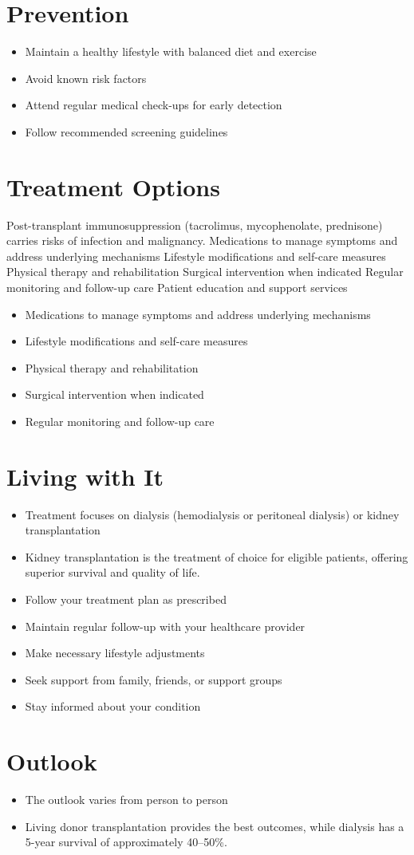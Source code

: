 \section{Prevention}
\begin{itemize}[noitemsep]
  \item Maintain a healthy lifestyle with balanced diet and exercise
  \item Avoid known risk factors
  \item Attend regular medical check-ups for early detection
  \item Follow recommended screening guidelines
\end{itemize}
\section{Treatment Options}
Post-transplant immunosuppression (tacrolimus, mycophenolate, prednisone) carries risks of infection and malignancy. Medications to manage symptoms and address underlying mechanisms Lifestyle modifications and self-care measures Physical therapy and rehabilitation Surgical intervention when indicated Regular monitoring and follow-up care Patient education and support services

\begin{itemize}[noitemsep]
  \item Medications to manage symptoms and address underlying mechanisms
  \item Lifestyle modifications and self-care measures
  \item Physical therapy and rehabilitation
  \item Surgical intervention when indicated
  \item Regular monitoring and follow-up care
\end{itemize}
\section{Living with It}
\begin{itemize}[noitemsep]
  \item Treatment focuses on dialysis (hemodialysis or peritoneal dialysis) or kidney transplantation
  \item Kidney transplantation is the treatment of choice for eligible patients, offering superior survival and quality of life.
  \item Follow your treatment plan as prescribed
  \item Maintain regular follow-up with your healthcare provider
  \item Make necessary lifestyle adjustments
  \item Seek support from family, friends, or support groups
  \item Stay informed about your condition
\end{itemize}
\section{Outlook}
\begin{itemize}[noitemsep]
  \item The outlook varies from person to person
  \item Living donor transplantation provides the best outcomes, while dialysis has a 5-year survival of approximately 40--50\%.
\end{itemize}
